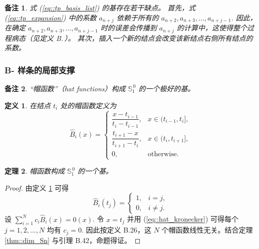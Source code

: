 \documentclass[a4paper]{ctexart}
\newtheorem{theorem}{定理}
\newtheorem{remark}{备注}
\newtheorem{definition}[theorem]{定义} %
\numberwithin{theorem}{section}
\numberwithin{equation}{section}
\numberwithin{figure}{section}
\numberwithin{remark}{section}
\begin{document}
\begin{remark}
    \label{rem::tp_drawbacks}
式 (\ref{eq::tp_basis_list}) 的基存在若干缺点。
首先，式 (\ref{eq::tp_expansion}) 中的系数 $a_{n+j}$ 依赖于所有的 $a_{n+2},a_{n+3},\ldots,a_{n+j-1}$. 
因此，在确定 $a_{n+2},a_{n+3},\ldots,a_{n+j-1}$ 时的误差会传播到 $a_{n+j}$ 的计算中，这使得整个过程病态（见定义 B.\,）。
其次，插入一个新的结点会改变该新结点右侧所有结点的系数。
\end{remark}

\subsubsection{B- 样条的局部支撑}
\label{subsec::local_support_bspline}

\begin{remark}
    \label{rem::hat_good_basis}
“帽函数”（hat functions）构成 $\mathbb{S}^{\,0}_{1}$ 的一个极好的基。
\end{remark}

\begin{definition}
    \label{def::hat_function}
在结点 $t_i$ 处的帽函数定义为
\begin{equation}
    \label{eq::hat_function}
\hat{B}_i(x)=
\begin{cases}
\dfrac{x-t_{i-1}}{t_i-t_{i-1}}, & x\in(t_{i-1},t_i],\\[6pt]
\dfrac{t_{i+1}-x}{t_{i+1}-t_i}, & x\in(t_i,t_{i+1}],\\[6pt]
0, & \text{otherwise}.
\end{cases}
\end{equation}
\end{definition}

\begin{theorem}
    \label{thm::hat_form_basis}
帽函数构成 $\mathbb{S}^{\,0}_{1}$ 的一个基。
\end{theorem}

\begin{proof}
由定义 \ref{def::hat_function} 可得
\begin{equation}
\label{eq::hat_kronecker}
\hat{B}_i(t_j)=
\begin{cases}
1, & i=j,\\
0, & i\ne j.
\end{cases}
\end{equation}
设 $\sum_{i=1}^{N} c_i \hat{B}_i(x)=0(x)$. 
令 $x=t_j$ 并用 (\ref{eq::hat_kronecker}) 可得每个 $j=1,2,\ldots,N$ 均有 $c_j=0$.
因此按定义 B.26，这 $N$ 个帽函数线性无关。结合定理 \ref{thm::dim_Sn} 与引理 B.42，命题得证。
\end{proof}
\end{document}
